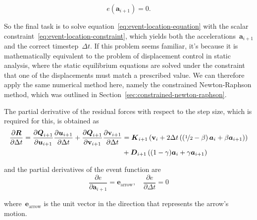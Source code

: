 \begin{equation}
e(\boldsymbol{a}_{i+1}) = 0. \label{eq:event-location-constraint}
\end{equation}

So the final task is to solve equation~\eqref{eq:event-location-equation} with the scalar constraint~\eqref{eq:event-location-constraint}, which yields both the accelerations~$\boldsymbol{a}_{i+1}$ and the correct timestep~$\Delta t$.
If this problem seems familiar, it's because it is mathematically equivalent to the problem of displacement control in static analysis, where the static equilibrium equations are solved under the constraint that one of the displacements must match a prescribed value.
We can therefore apply the same numerical method here, namely the constrained Newton-Raphson method, which was outlined in Section~\ref{sec:constrained-newton-raphson}.

The partial derivative of the residual forces with respect to the step size, which is required for this, is obtained as
%
\begin{align}
\frac{\partial \boldsymbol{R}}{\partial \Delta t} = \frac{\partial \boldsymbol{Q}_{i+1}}{\partial \boldsymbol{u}_{i+1}}\frac{\partial \boldsymbol{u}_{i+1}}{\partial \Delta t} + \frac{\partial \boldsymbol{Q}_{i+1}}{\partial \boldsymbol{\mathrm{v}}_{i+1}}\frac{\partial \boldsymbol{\mathrm{v}}_{i+1}}{\partial \Delta t} &= \boldsymbol{K}_{i+1}\left(\boldsymbol{\mathrm{v}}_{i} + 2\Delta t\left(\left(\nicefrac{1}{2} - \beta\right)\boldsymbol{a}_{i} + \beta \boldsymbol{a}_{i+1}\right) \right) \notag \\
&+ \boldsymbol{D}_{i+1}\left((1 - \gamma)\boldsymbol{a}_{i} + \gamma\boldsymbol{a}_{i+1}\right)
\end{align}

and the partial derivatives of the event function are
%
\begin{equation}
\frac{\partial e}{\partial\boldsymbol{a}_{i+1}} = \boldsymbol{e}_{\mathrm{arrow}}, \quad \frac{\partial e}{\partial\Delta t} = 0
\end{equation}

where~$\boldsymbol{e}_{\mathrm{arrow}}$ is the unit vector in the direction that represents the arrow's motion.